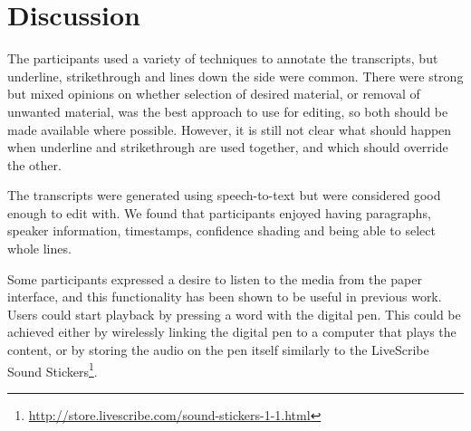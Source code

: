 
\section{Discussion}
The participants used a variety of techniques to annotate the transcripts, 
but underline, strikethrough and lines down the side were common. There were
strong but mixed opinions on whether selection of desired material, or removal
of unwanted material, was the best approach to use for editing, so both should
be made available where possible. However, it is still not clear what should
happen when underline and strikethrough are used together, and which should
override the other.

The transcripts were generated using speech-to-text but were considered good
enough to edit with. We found that participants enjoyed having paragraphs, speaker
information, timestamps, confidence shading and being able to select whole lines.

Some participants expressed a desire to listen to the media
from the paper interface, and this functionality has been shown to be useful
in previous work. Users could start playback by pressing a word with the
digital pen. This could be achieved either by wirelessly
linking the digital pen to a computer that plays the content, or by storing
the audio on the pen itself similarly to the LiveScribe Sound
Stickers\footnote{\url{http://store.livescribe.com/sound-stickers-1-1.html}}.

